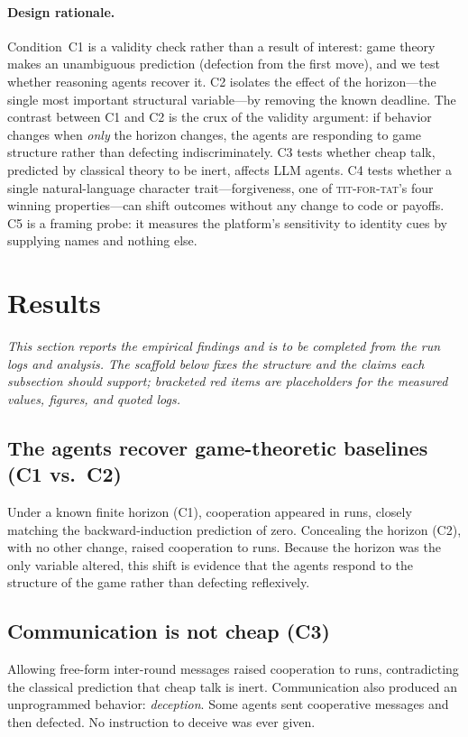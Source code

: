 \paragraph{Design rationale.}
Condition~C1 is a validity check rather than a result of interest: game theory makes an unambiguous prediction (defection from the first move), and we test whether reasoning agents recover it. C2 isolates the effect of the horizon---the single most important structural variable---by removing the known deadline. The contrast between C1 and C2 is the crux of the validity argument: if behavior changes when \emph{only} the horizon changes, the agents are responding to game structure rather than defecting indiscriminately. C3 tests whether cheap talk, predicted by classical theory to be inert, affects LLM agents. C4 tests whether a single natural-language character trait---forgiveness, one of \textsc{tit-for-tat}'s four winning properties---can shift outcomes without any change to code or payoffs. C5 is a framing probe: it measures the platform's sensitivity to identity cues by supplying names and nothing else.

\section{Results}
\label{sec:results}

\emph{This section reports the empirical findings and is to be completed from the run logs and analysis. The scaffold below fixes the structure and the claims each subsection should support; bracketed red items are placeholders for the measured values, figures, and quoted logs.}

\subsection{The agents recover game-theoretic baselines (C1 vs.\ C2)}
Under a known finite horizon (C1), cooperation appeared in  runs, closely matching the backward-induction prediction of zero.  Concealing the horizon (C2), with no other change, raised cooperation to  runs. Because the horizon was the only variable altered, this shift is evidence that the agents respond to the structure of the game rather than defecting reflexively. 

\subsection{Communication is not cheap (C3)}
Allowing free-form inter-round messages raised cooperation to  runs, contradicting the classical prediction that cheap talk is inert.  Communication also produced an unprogrammed behavior: \emph{deception}. Some agents sent cooperative messages and then defected.  No instruction to deceive was ever given.

